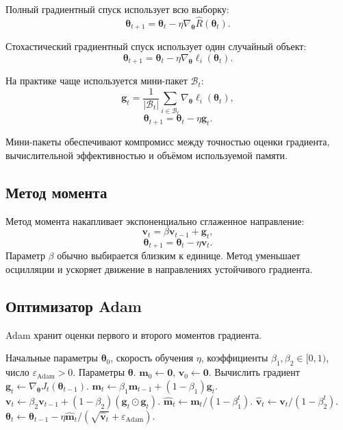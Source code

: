 \documentclass[12pt,a4paper]{article}
\theoremstyle{definition}
\newcommand{\1}{\mathbf{1}}
\newcommand{\eps}{\varepsilon}
\begin{document}
Полный градиентный спуск использует всю выборку:
\[
    \bm{\theta}_{t+1}
    =
    \bm{\theta}_t
    -
    \eta\nabla_{\bm{\theta}}
    \widehat{R}(\bm{\theta}_t).
\]

Стохастический градиентный спуск использует один случайный объект:
\[
    \bm{\theta}_{t+1}
    =
    \bm{\theta}_t
    -
    \eta
    \nabla_{\bm{\theta}}
    \ell_i(\bm{\theta}_t).
\]

На практике чаще используется мини-пакет $\mathcal{B}_t$:
\[
    \bm{g}_t
    =
    \frac{1}{|\mathcal{B}_t|}
    \sum_{i\in\mathcal{B}_t}
    \nabla_{\bm{\theta}}\ell_i(\bm{\theta}_t),
\]
\[
    \bm{\theta}_{t+1}
    =
    \bm{\theta}_t-\eta\bm{g}_t.
\]

Мини-пакеты обеспечивают компромисс между точностью оценки градиента,
вычислительной эффективностью и объёмом используемой памяти.

\subsection{Метод момента}

Метод момента накапливает экспоненциально сглаженное направление:
\[
    \bm{v}_t
    =
    \beta\bm{v}_{t-1}
    +
    \bm{g}_t,
\]
\[
    \bm{\theta}_{t+1}
    =
    \bm{\theta}_t-\eta\bm{v}_t.
\]
Параметр $\beta$ обычно выбирается близким к единице. Метод уменьшает
осцилляции и ускоряет движение в направлениях устойчивого градиента.

\subsection{Оптимизатор Adam}

Adam хранит оценки первого и второго моментов градиента.

\begin{algorithm}[h]
\caption{Adam}
\begin{algorithmic}[1]
\Require Начальные параметры $\bm{\theta}_0$, скорость обучения
$\eta$, коэффициенты $\beta_1,\beta_2\in[0,1)$,
число $\eps_{\mathrm{Adam}}>0$.
\Ensure Параметры $\bm{\theta}$.
\State $\bm{m}_0\gets\bm{0}$, $\bm{v}_0\gets\bm{0}$.
    \State Вычислить градиент
    $\bm{g}_t\gets\nabla_{\bm{\theta}}J_t(\bm{\theta}_{t-1})$.
    \State
    $\bm{m}_t
    \gets
    \beta_1\bm{m}_{t-1}
    +(1-\beta_1)\bm{g}_t$.
    \State
    $\bm{v}_t
    \gets
    \beta_2\bm{v}_{t-1}
    +(1-\beta_2)(\bm{g}_t\odot\bm{g}_t)$.
    \State
    $\widehat{\bm{m}}_t
    \gets
    \bm{m}_t/(1-\beta_1^t)$.
    \State
    $\widehat{\bm{v}}_t
    \gets
    \bm{v}_t/(1-\beta_2^t)$.
    \State
    $\bm{\theta}_t
    \gets
    \bm{\theta}_{t-1}
    -
    \eta
    \widehat{\bm{m}}_t/
    (\sqrt{\widehat{\bm{v}}_t}+\eps_{\mathrm{Adam}})$.
\EndFor
\end{algorithmic}
\end{algorithm}
\end{document}
